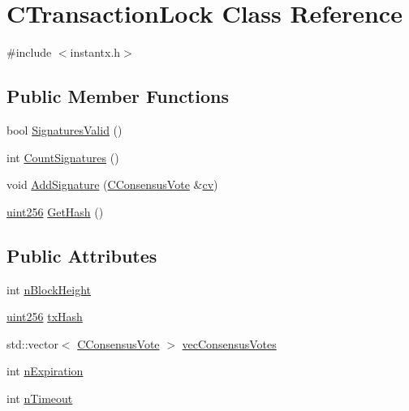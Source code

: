 \hypertarget{class_c_transaction_lock}{}\section{C\+Transaction\+Lock Class Reference}
\label{class_c_transaction_lock}


{\ttfamily \#include $<$instantx.\+h$>$}

\subsection*{Public Member Functions}
\begin{DoxyCompactItemize}
\item 
bool \hyperlink{class_c_transaction_lock_a71cb6705a8f0bfb4a8453d3b284e3cf7}{Signatures\+Valid} ()
\item 
int \hyperlink{class_c_transaction_lock_aa74b16eec6daee397785a91193fc3306}{Count\+Signatures} ()
\item 
void \hyperlink{class_c_transaction_lock_a8f09c2c0453950fb6deadcccf5f518d7}{Add\+Signature} (\hyperlink{class_c_consensus_vote}{C\+Consensus\+Vote} \&\hyperlink{db__bench_8cc_aa35826d3f6dc34ef1f1b35dee6db9d91}{cv})
\item 
\hyperlink{classuint256}{uint256} \hyperlink{class_c_transaction_lock_a2142d2e27db93d33ac93761058f8d803}{Get\+Hash} ()
\end{DoxyCompactItemize}
\subsection*{Public Attributes}
\begin{DoxyCompactItemize}
\item 
int \hyperlink{class_c_transaction_lock_a358a18da2b8b378cc7cd1dae145f611f}{n\+Block\+Height}
\item 
\hyperlink{classuint256}{uint256} \hyperlink{class_c_transaction_lock_a9d4babccfcdf7fe3806dd3ec1b56d08a}{tx\+Hash}
\item 
std\+::vector$<$ \hyperlink{class_c_consensus_vote}{C\+Consensus\+Vote} $>$ \hyperlink{class_c_transaction_lock_a399f0d14a38794034c5f530599e95b3a}{vec\+Consensus\+Votes}
\item 
int \hyperlink{class_c_transaction_lock_aec15172be9c7f1cbe4b989387fdb1b52}{n\+Expiration}
\item 
int \hyperlink{class_c_transaction_lock_a8c18d2530bfcea24bee8d5773d12c0a9}{n\+Timeout}
\end{DoxyCompactItemize}



